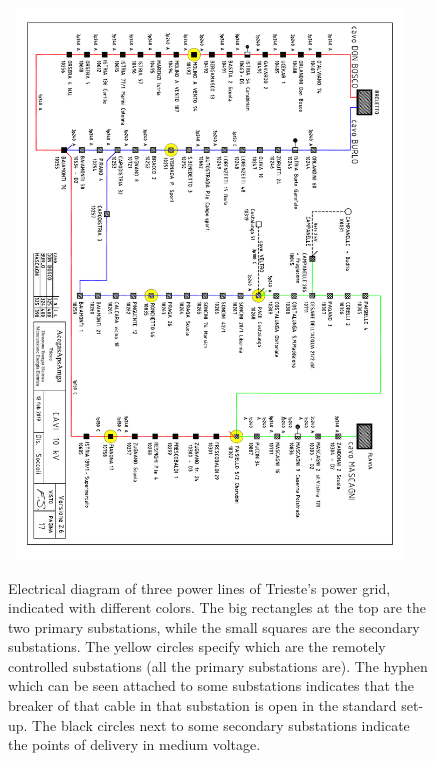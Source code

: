 \begin{figure}[ph]
    \centering
    \mbox{
        \checkoddpage
        \ifoddpage \hspace*{20pt}  %
        \else \hspace*{-50pt} %
        \fi
        \includegraphics[width=0.92\textwidth, angle=90, center]{chapters/figures/Mastrino.pdf}
    }
    \caption{Electrical diagram of three power lines of Trieste's power grid, indicated with different colors. The big rectangles at the top are the two primary substations, while the small squares are the secondary substations. The yellow circles specify which are the remotely controlled substations (all the primary substations are). The hyphen which can be seen attached to some substations indicates that the breaker of that cable in that substation is open in the standard set-up. The black circles next to some secondary substations indicate the points of delivery in medium voltage.}
    \label{fig:mastrino}
\end{figure}

